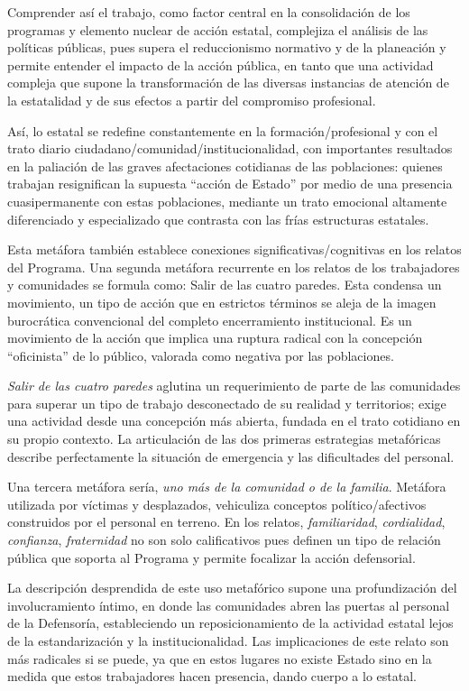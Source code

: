 \documentclass[
  spanish,
  11pt,
  a4paper,
]{scrbook}
\begin{document}
Comprender así el trabajo, como factor central en la consolidación de
los programas y elemento nuclear de acción estatal, complejiza el
análisis de las políticas públicas, pues supera el reduccionismo
normativo y de la planeación y permite entender el impacto de la acción
pública, en tanto que una actividad compleja que supone la
transformación de las diversas instancias de atención de la estatalidad
y de sus efectos a partir del compromiso profesional.

Así, lo estatal se redefine constantemente en la formación/profesional y
con el trato diario ciudadano/comunidad/institucionalidad, con
importantes resultados en la paliación de las graves afectaciones
cotidianas de las poblaciones: quienes trabajan resignifican la supuesta
``acción de Estado'' por medio de una presencia cuasipermanente con
estas poblaciones, mediante un trato emocional altamente diferenciado y
especializado que contrasta con las frías estructuras estatales.

Esta metáfora también establece conexiones significativas/cognitivas en
los relatos del Programa. Una segunda metáfora recurrente en los relatos
de los trabajadores y comunidades se formula como: Salir de las cuatro
paredes. Esta condensa un movimiento, un tipo de acción que en estrictos
términos se aleja de la imagen burocrática convencional del completo
encerramiento institucional. Es un movimiento de la acción que implica
una ruptura radical con la concepción ``oficinista'' de lo público,
valorada como negativa por las poblaciones.

\emph{Salir de las cuatro paredes} aglutina un requerimiento de parte de
las comunidades para superar un tipo de trabajo desconectado de su
realidad y territorios; exige una actividad desde una concepción más
abierta, fundada en el trato cotidiano en su propio contexto. La
articulación de las dos primeras estrategias metafóricas describe
perfectamente la situación de emergencia y las dificultades del
personal.

Una tercera metáfora sería, \emph{uno más de la comunidad o de la
familia}. Metáfora utilizada por víctimas y desplazados, vehiculiza
conceptos político/afectivos construidos por el personal en terreno. En
los relatos, \emph{familiaridad}, \emph{cordialidad}, \emph{confianza},
\emph{fraternidad} no son solo calificativos pues definen un tipo de
relación pública que soporta al Programa y permite focalizar la acción
defensorial.

La descripción desprendida de este uso metafórico supone una
profundización del involucramiento íntimo, en donde las comunidades
abren las puertas al personal de la Defensoría, estableciendo un
reposicionamiento de la actividad estatal lejos de la estandarización y
la institucionalidad. Las implicaciones de este relato son más radicales
si se puede, ya que en estos lugares no existe Estado sino en la medida
que estos trabajadores hacen presencia, dando cuerpo a lo estatal.
\end{document}
